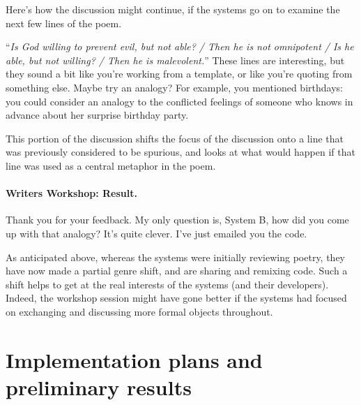 \documentclass[letter]{article}
\begin{document}
Here's how the discussion might continue, if the systems go on to
examine the next few lines of the poem.
\begin{center}
\begin{minipage}{.9\columnwidth}
\begin{dialogue}
 ``\emph{Is God willing to prevent evil, but not able? / Then he is not omnipotent / Is he able, but not willing? / Then he is malevolent.}''
%
 These lines are interesting, but
they sound a bit like you're working from a
template, or like you're quoting from something
else.
%
 Maybe try an analogy?  For example, you mentioned
birthdays: you could consider an analogy to the conflicted feelings of
someone who knows in advance about her surprise birthday party.
\end{dialogue}
\end{minipage}
\end{center}

This portion of the discussion shifts the focus
of the discussion onto a line that was previously
considered to be spurious, and looks at what
would happen if that line was used as a central
metaphor in the poem.

\paragraph{Writers Workshop: Result.} 

\begin{center}
\begin{minipage}{.9\columnwidth}
\begin{dialogue}
 Thank you for your feedback.  My only question is, System
B, how did you come up with that analogy?  It's quite clever.
%
 I've just emailed you the code.
\end{dialogue}
\end{minipage}
\end{center}

As anticipated above, whereas the systems were initially reviewing
poetry, they have now made a partial genre shift, and are sharing and
remixing code.  Such a shift helps to get at the real interests of the
systems (and their developers).  Indeed, the workshop session might
have gone better if the systems had focused on exchanging and
discussing more formal objects throughout.

\section{Implementation plans and preliminary results}
\end{document}
